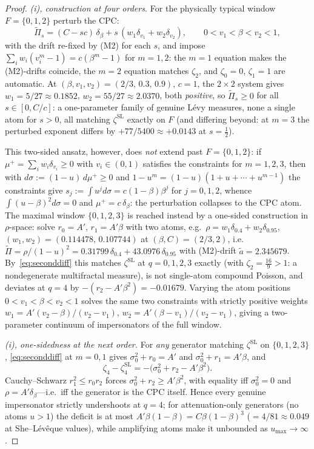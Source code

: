 \documentclass[pdflatex,sn-mathphys-num]{sn-jnl}
\theoremstyle{thmstyleone}
\theoremstyle{thmstyletwo}
\theoremstyle{thmstylethree}
\begin{document}
\begin{proof}
\smallskip
\textit{(i), construction at four orders.}  For the physically
typical window $F = \{0,1,2\}$ perturb the CPC:
\[
  \tilde\Pi_s = (C - sc)\,\delta_\beta + s\,(w_1\delta_{v_1} +
  w_2\delta_{v_2}),
  \qquad 0 < v_1 < \beta < v_2 < 1,
\]
with the drift re-fixed by (M2) for each $s$, and impose
$\sum_{i} w_i(v_i^m - 1) = c(\beta^m - 1)$ for $m = 1, 2$: the
$m=1$ equation makes the (M2)-drifts coincide, the $m=2$ equation
matches $\zeta_2$, and $\zeta_0 = 0$, $\zeta_1 = 1$ are automatic.
At $(\beta, v_1, v_2) = (2/3,\,0.3,\,0.9)$, $c = 1$, the $2\times2$
system gives $w_1 = 5/27 \approx 0.1852$, $w_2 = 55/27 \approx
2.0370$, both \emph{positive}, so $\tilde\Pi_s \ge 0$ for all $s
\in [0, C/c]$: a one-parameter family of genuine L\'evy measures,
none a single atom for $s > 0$, all matching $\zeta^{\mathrm{SL}}$
exactly on $F$ (and differing beyond: at $m = 3$ the perturbed
exponent differs by $+77/5400 \approx +0.0143$ at $s = \tfrac12$).

This two-sided ansatz, however, does \emph{not} extend past $F =
\{0,1,2\}$: if $\mu^+ = \sum_i w_i\delta_{v_i} \ge 0$ with $v_i \in
(0,1)$ satisfies the constraints for $m = 1, 2, 3$, then with
$d\sigma := (1-u)\,d\mu^+ \ge 0$ and $1 - u^m =
(1-u)(1 + u + \cdots + u^{m-1})$ the constraints give $s_j := \int
u^j d\sigma = c(1-\beta)\beta^j$ for $j = 0, 1, 2$, whence
$\int(u-\beta)^2 d\sigma = 0$ and $\mu^+ = c\,\delta_\beta$: the
perturbation collapses to the CPC atom.  The maximal window
$\{0,1,2,3\}$ is reached instead by a one-sided construction in
$\rho$-space: solve $r_0 = A'$, $r_1 = A'\beta$ with two atoms,
e.g.\ $\rho = w_1\delta_{0.4} + w_2\delta_{0.95}$, $(w_1, w_2) =
(0.114478,\,0.107744)$ at $(\beta, C) = (2/3, 2)$, i.e.\
$\tilde\Pi = \rho/(1-u)^2 = 0.31799\,\delta_{0.4} +
43.0976\,\delta_{0.95}$ with (M2)-drift $\tilde a = 2.345679$.
By~\eqref{eq:seconddiff} this matches $\zeta^{\mathrm{SL}}$ at $q =
0, 1, 2, 3$ exactly (with $\zeta_2 = \tfrac{16}{9} > 1$: a
nondegenerate multifractal measure), is not single-atom compound
Poisson, and deviates at $q = 4$ by $-(r_2 - A'\beta^2) = -0.01679$.
Varying the atom positions $0 < v_1 < \beta < v_2 < 1$ solves the
same two constraints with strictly positive weights $w_1 =
A'(v_2-\beta)/(v_2-v_1)$, $w_2 = A'(\beta-v_1)/(v_2-v_1)$, giving a
two-parameter continuum of impersonators of the full window.

\smallskip
\textit{(i), one-sidedness at the next order.}  For \emph{any}
generator matching $\zeta^{\mathrm{SL}}$ on $\{0,1,2,3\}$,
\eqref{eq:seconddiff} at $m = 0, 1$ gives $\sigma_0^2 + r_0 = A'$
and $\sigma_0^2 + r_1 = A'\beta$, and
\[
  \zeta_{4} - \zeta^{\mathrm{SL}}_{4}
  = -\bigl(\sigma_0^2 + r_2 - A'\beta^2\bigr) .
\]
Cauchy--Schwarz $r_1^2 \le r_0 r_2$ forces $\sigma_0^2 + r_2 \ge
A'\beta^2$, with equality iff $\sigma_0^2 = 0$ and $\rho =
A'\delta_\beta$---i.e.\ iff the generator is the CPC itself.  Hence
every genuine impersonator strictly undershoots at $q = 4$; for
attenuation-only generators (no atoms $u > 1$) the deficit is at
most $A'\beta(1-\beta) = C\beta(1-\beta)^3$
($= 4/81 \approx 0.049$ at She--L\'ev\^eque values), while
amplifying atoms make it unbounded as $u_{\max} \to \infty$.
\end{proof}
\end{document}
